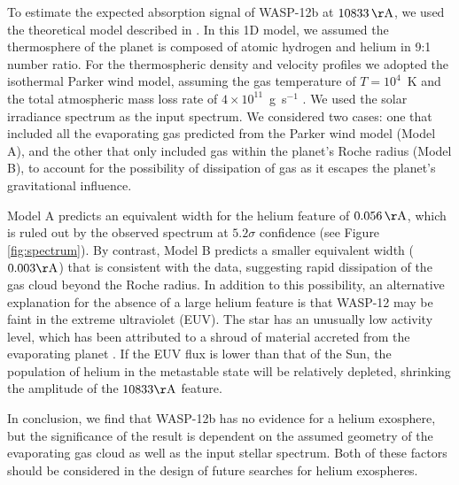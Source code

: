 \documentclass[RNAAS]{aastex62}
\begin{document}
To estimate the expected absorption signal of WASP-12b at $10833\,\mathrm{\AA}$,
we used the theoretical model described in \cite{oklopcic18}.
In this 1D model, we assumed the thermosphere of the planet is composed of atomic hydrogen and helium in 9:1 number
ratio. For the thermospheric density and velocity profiles we adopted the
isothermal Parker wind model, assuming the gas temperature of $T=10^4$~K and the
total atmospheric mass loss rate of $4\times 10^{11}$~g~s$^{-1}$ \citep[based on
the results of hydrodynamic simulations of atmospheric escape in WASP-12b
by][]{salz16}. We used the solar irradiance spectrum as the input spectrum. We
considered two cases: one that included all the evaporating gas predicted from
the Parker wind model (Model A), and the other
that only included gas within the planet's Roche radius (Model B), to account
for the possibility of dissipation of gas as it escapes the planet's gravitational influence.

Model A predicts an equivalent width for the helium feature of
$0.056\,\mathrm{\AA}$, which is ruled out by the observed spectrum at
$5.2\sigma$ confidence (see Figure\,\ref{fig:spectrum}). By contrast, Model B
predicts a smaller equivalent width ($0.003\mathrm{\AA}$) that is consistent
with the data, suggesting rapid dissipation of the gas cloud beyond the Roche
radius.  In addition to this possibility, an alternative explanation for the
absence of a large helium feature is that WASP-12 may be faint in the extreme
ultraviolet (EUV). The star has an unusually low activity level, which has been attributed to a shroud of material accreted from the evaporating planet \citep{haswell17}. If the EUV flux is lower than that of the Sun, the population of helium in the metastable state will be relatively depleted, shrinking the amplitude of the $10833\mathrm{\AA}$ feature.



In conclusion, we find that WASP-12b has no evidence for a helium exosphere, but the
significance of the result is dependent on the assumed geometry of the
evaporating gas cloud as well as the input stellar spectrum.  Both of these factors should be considered in the design of future searches for helium exospheres.
\end{document}
